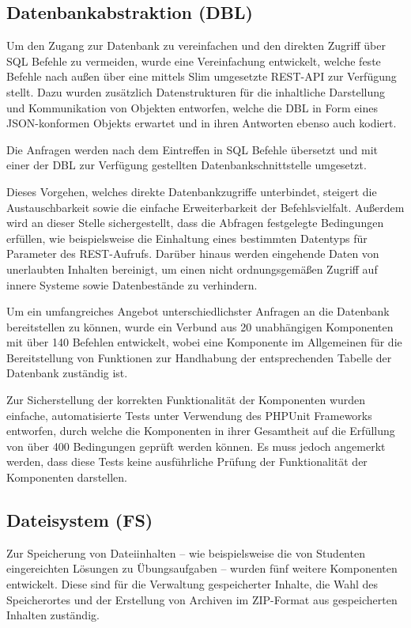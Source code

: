 \subsection{Datenbankabstraktion (DBL)}
\parbox{\textwidth}{Um den Zugang zur Datenbank zu vereinfachen und den direkten Zugriff über SQL Befehle zu vermeiden, wurde eine Vereinfachung entwickelt, welche feste Befehle nach außen über eine mittels Slim umgesetzte REST-API zur Verfügung stellt. Dazu wurden zusätzlich Datenstrukturen für die inhaltliche Darstellung und Kommunikation von Objekten entworfen, welche die DBL in Form eines JSON-konformen Objekts erwartet und in ihren Antworten ebenso auch kodiert.}

\parbox{\textwidth}{Die Anfragen werden nach dem Eintreffen in SQL Befehle übersetzt und mit einer der DBL zur Verfügung gestellten Datenbankschnittstelle umgesetzt.}

\parbox{\textwidth}{Dieses Vorgehen, welches direkte Datenbankzugriffe unterbindet, steigert die Austauschbarkeit sowie die einfache Erweiterbarkeit der Befehlsvielfalt. Außerdem wird an dieser Stelle sichergestellt, dass die Abfragen festgelegte Bedingungen erfüllen, wie beispielsweise die Einhaltung eines bestimmten Datentyps für Parameter des REST-Aufrufs. Darüber hinaus werden eingehende Daten von unerlaubten Inhalten bereinigt, um einen nicht ordnungsgemäßen Zugriff auf innere Systeme sowie Datenbestände zu verhindern.}

\parbox{\textwidth}{Um ein umfangreiches Angebot unterschiedlichster Anfragen an die Datenbank bereitstellen zu können, wurde ein Verbund aus 20 unabhängigen Komponenten mit über 140 Befehlen entwickelt, wobei eine  Komponente im Allgemeinen für die Bereitstellung von Funktionen zur Handhabung der entsprechenden Tabelle der Datenbank zuständig ist.}

\parbox{\textwidth}{Zur Sicherstellung der korrekten Funktionalität der Komponenten wurden einfache, automatisierte Tests unter Verwendung des PHPUnit Frameworks entworfen, durch welche die Komponenten in ihrer Gesamtheit auf die Erfüllung von über 400 Bedingungen geprüft werden können. Es muss jedoch angemerkt werden, dass diese Tests keine ausführliche Prüfung der Funktionalität der Komponenten darstellen.}

\subsection{Dateisystem (FS)}
\parbox{\textwidth}{Zur Speicherung von Dateiinhalten -- wie beispielsweise die von Studenten eingereichten Lösungen zu Übungsaufgaben -- wurden fünf weitere Komponenten entwickelt. Diese sind für die Verwaltung gespeicherter Inhalte, die Wahl des Speicherortes und der Erstellung von Archiven im ZIP-Format aus gespeicherten Inhalten zuständig. }

